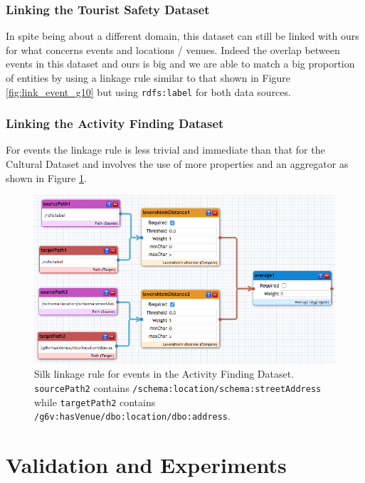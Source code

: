 \documentclass[runningheads,a4paper]{../../StyleFiles/llncs}
\begin{document}
\subsubsection{Linking the Tourist Safety Dataset}
In spite being about a different domain, this dataset can still be linked with
ours for what concerns events and locations / venues. Indeed the overlap between
events in this dataset and ours is big and we are able to match a big proportion
of entities by using a linkage rule similar to that shown in Figure
\ref{fig:link_event_g10} but using \texttt{rdfs:label} for both data sources.

\subsubsection{Linking the Activity Finding Dataset}
For events the linkage rule is less trivial and immediate than that for the
Cultural Dataset and involves the use of more properties and an aggregator as
shown in Figure \ref{fig:link_event_g15}.

\begin{figure}[h]
	\centering
	\includegraphics[width=1\textwidth]{img/link_event_g15.png}
	\caption{Silk linkage rule for events in the Activity Finding Dataset.
		\texttt{sourcePath2} contains
		\texttt{/schema:location/schema:streetAddress} while
		\texttt{targetPath2} contains
		\texttt{/g6v:hasVenue/dbo:location/dbo:address}.}
	\label{fig:link_event_g15}
\end{figure}


\section{Validation and Experiments}
\end{document}

